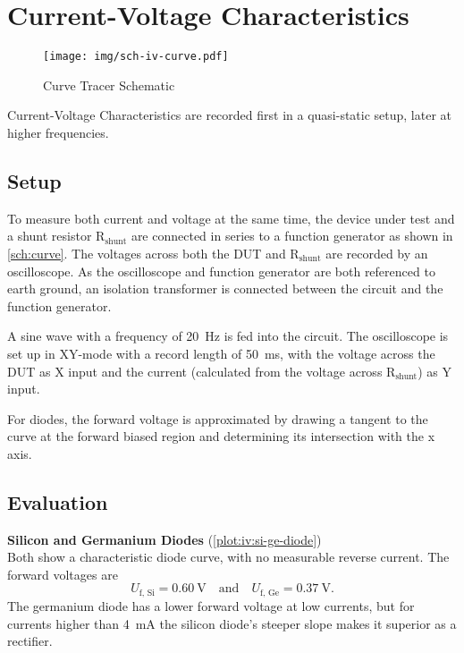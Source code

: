 \chapter{Current-Voltage Characteristics}

\begin{figure}[tbp]
	\centering
	\texttt{[image: img/sch-iv-curve.pdf]}
	\caption{Curve Tracer Schematic}
	\label{sch:curve}
\end{figure}

Current-Voltage Characteristics are recorded first in a quasi-static setup, later at higher frequencies.

\section{Setup}

To measure both current and voltage at the same time, the device under test and a shunt resistor $\mathrm{R_{shunt}}$ are connected in series to a function generator as shown in \autoref{sch:curve}.
The voltages across both the DUT and $\mathrm{R_{shunt}}$ are recorded by an oscilloscope.
As the oscilloscope and function generator are both referenced to earth ground, an isolation transformer is connected between the circuit and the function generator.

A sine wave with a frequency of \SI{20}{\hertz} is fed into the circuit.
The oscilloscope is set up in XY-mode with a record length of \SI{50}{\ms}, with the voltage across the DUT as X input and the current (calculated from the voltage across $\mathrm{R_{shunt}}$) as Y input.

For diodes, the forward voltage is approximated by drawing a tangent to the curve at the forward biased region and determining its intersection with the x axis.

\section{Evaluation}

\textbf{Silicon and Germanium Diodes} (\autoref{plot:iv:si-ge-diode})\\
Both show a characteristic diode curve, with no measurable reverse current.
The forward voltages are
\begin{equation*}
	U_\text{f, Si} = \SI{0.60}{\volt} \quad \text{and} \quad U_\text{f, Ge} = \SI{0.37}{\volt}.
\end{equation*}
The germanium diode has a lower forward voltage at low currents, but for currents higher than \SI{4}{\mA} the silicon diode's steeper slope makes it superior as a rectifier.

